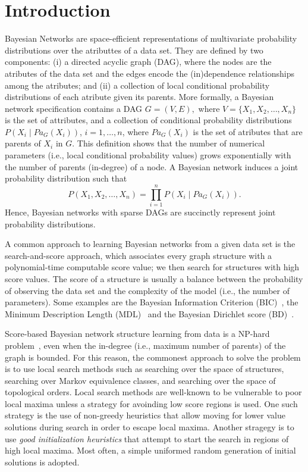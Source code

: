 \section{Introduction}
\label{sec:introduction}

Bayesian Networks are space-efficient representations of multivariate
probability distributions over the atributtes of a data set. They are
defined by two components: (i) a directed acyclic graph (DAG), where the
nodes are the atributes of the data set and the edges encode the
(in)dependence relationships among the atributes; and (ii) a collection
of local conditional probability distributions of each atribute given
its parents. More formally, a Bayesian network specification contains a
DAG \( G = ( V , E ), \) where $V = \{ X_1 , X_2 , \ldots , X_n \}$ is
the set of attributes, and a collection of conditional probability
distributions \( P( X_i \mid {Pa}_G( X_i ) ) \), $i=1,\ldots,n$, where
${Pa}_G( X_i )$ is the set of atributes that are parents of $X_i$ in
$G$. This definition shows that the number of numerical parameters
(i.e., local conditional probability values) grows exponentially with
the number of parents (in-degree) of a node. A Bayesian network induces
a joint probability distribution such that
\[ P( X_1 , X_2 , \ldots , X_n ) = \prod_{i=1}^{n} P( X_i \mid {Pa}_G( X_i ) ).  \]
Hence, Bayesian networks with sparse DAGs are succinctly represent joint
probability distributions.

A common approach to learning Bayesian networks from a given data set is
the search-and-score approach, which associates every graph structure
with a polynomial-time computable score value; we then search
for structures with high score values. The score of a structure is
usually a balance between the probability of observing the data set and
the complexity of the model (i.e., the number of parameters). Some
examples are the Bayesian Information Criterion (BIC)~\cite{BIC91}, the
Minimum Description Length (MDL)~\cite{MDL94} and the Bayesian Dirichlet
score (BD)~\cite{BD95}.


Score-based Bayesian network structure learning from data is a NP-hard
problem~\cite{MSResearch04}, even when the in-degree (i.e., maximum
number of parents) of the graph is bounded. For this reason, the
commonest approach to solve the problem is to use local search methods
such as searching over the space of structures, searching over Markov
equivalence classes, and searching over the space of topological
orders. Local search methods are well-known to be vulnerable to poor
local maxima unless a strategy for avoinding low score regions is
used. One such strategy is the use of non-greedy heuristics that allow
moving for lower value solutions during search in order to escape local
maxima. Another stragegy is to use \emph{good initialization heuristics}
that attempt to start the search in regions of high local maxima. Most
often, a simple uniformed random generation of initial solutions is
adopted.

